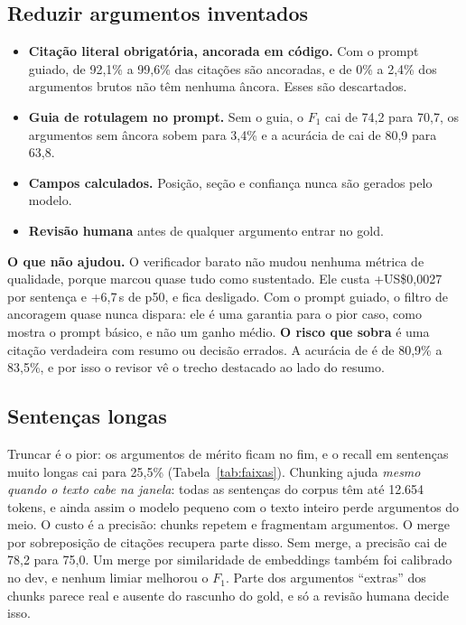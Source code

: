 \documentclass[11pt,a4paper]{article}
\newcommand{\cfg}[1]{\texttt{\detokenize{#1}}}
\begin{document}
\subsection{Reduzir argumentos inventados}\label{sec:q2-invencao}
\begin{itemize}
  \item \textbf{Citação literal obrigatória, ancorada em código.} Com o prompt guiado, de 92,1\%
    a 99,6\% das citações são ancoradas, e de 0\% a 2,4\% dos argumentos brutos não têm
    nenhuma âncora. Esses são descartados.
  \item \textbf{Guia de rotulagem no prompt.} Sem o guia, o $F_1$ cai de 74,2 para 70,7, os
    argumentos sem âncora sobem para 3,4\% e a acurácia de \cfg{decisao} cai de 80,9 para 63,8.
  \item \textbf{Campos calculados.} Posição, seção e confiança nunca são gerados pelo modelo.
  \item \textbf{Revisão humana} antes de qualquer argumento entrar no gold.
\end{itemize}
\textbf{O que não ajudou.} O verificador barato não mudou nenhuma métrica de qualidade,
porque marcou quase tudo como sustentado. Ele custa +US\$0,0027 por sentença e +6,7\,s de p50, e
fica desligado. Com o prompt guiado, o filtro de ancoragem quase nunca dispara: ele é uma garantia
para o pior caso, como mostra o prompt básico, e não um ganho médio. \textbf{O risco que sobra}
é uma citação verdadeira com resumo ou decisão errados. A acurácia de \cfg{decisao} é de 80,9\% a
83,5\%, e por isso o revisor vê o trecho destacado ao lado do resumo.

\subsection{Sentenças longas}\label{sec:q2-longas}
Truncar é o pior: os argumentos de mérito ficam no fim, e o recall em sentenças muito longas cai
para 25,5\% (Tabela~\ref{tab:faixas}). Chunking ajuda \emph{mesmo quando o texto cabe na janela}:
todas as sentenças do corpus têm até 12.654 tokens, e ainda assim o modelo pequeno com o texto
inteiro perde argumentos do meio. O custo é a precisão: chunks repetem e fragmentam argumentos. O
merge por sobreposição de citações recupera parte disso. Sem merge, a precisão cai de 78,2 para
75,0. Um merge por similaridade de embeddings também foi calibrado no dev, e nenhum limiar
melhorou o $F_1$. Parte dos argumentos ``extras'' dos chunks parece real e ausente do rascunho do
gold, e só a revisão humana decide isso.
\end{document}
